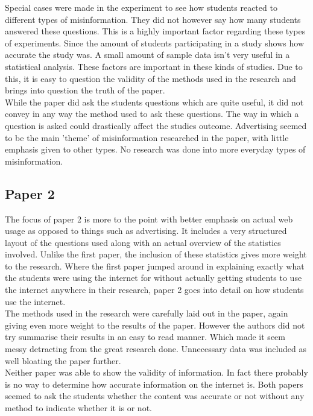 \documentclass[11pt]{article}
\begin{document}
Special cases were made in the experiment to see how students reacted to different types of misinformation. They did not however say how many students answered these questions. This is a highly important factor regarding these types of experiments. Since the amount of students participating in a study shows how accurate the study was. A small amount of sample data isn't very useful in a statistical analysis. These factors are important in these kinds of studies.  Due to this, it is easy to question the validity of the methods used in the research and brings into question the truth of the paper.
\\

While the paper did ask the students questions which are quite useful, it did not convey in any way the method used to ask these questions. The way in which a question is asked could drastically affect the studies outcome. Advertising seemed to be the main 'theme' of misinformation researched in the paper, with little emphasis given to other types. No research was done into more everyday types of misinformation.


\subsection{Paper 2}
The focus of paper 2 is more to the point with better emphasis on actual web usage as opposed to things such as advertising. It includes a very structured layout of the questions used along with an actual overview of the statistics involved. Unlike the first paper, the inclusion of these statistics gives more weight to the research. Where the first paper jumped around in explaining exactly what the students were using the internet for without actually getting students to use the internet anywhere in their research, paper 2 goes into detail on how students use  the internet.
\\

The methods used in the research were carefully laid out in the paper, again giving even more weight to the results of the paper. However the authors did not try summarise their results in an easy to read manner. Which made it seem messy detracting from the great research done. Unnecessary data was included as well bloating the paper further.
\\

Neither paper was able to show the validity of information. In fact there probably is no way to determine how accurate information on the internet is. Both papers seemed to ask the students whether the content was accurate or not without any method to indicate whether it is or not.
\end{document}

